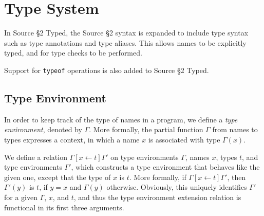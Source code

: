 \newcommand{\Rule}[2]{\genfrac{}{}{0.7pt}{}{{\setlength{\fboxrule}{0pt}\setlength{\fboxsep}{3mm}\fbox{$#1$}}}{{\setlength{\fboxrule}{0pt}\setlength{\fboxsep}{3mm}\fbox{$#2$}}}}

\newcommand{\TruE}{\textbf{\texttt{true}}}
\newcommand{\FalsE}{\textbf{\texttt{false}}}
\newcommand{\AndOp}{\texttt{\&\&}}
\newcommand{\OrOp}{\texttt{||}}
\newcommand{\ThenOp}{\texttt{?}}
\newcommand{\ElseOp}{\texttt{:}}
\newcommand{\Rc}{\texttt{\}}}
\newcommand{\Lc}{\texttt{\{}}
\newcommand{\Rp}{\texttt{)}}
\newcommand{\Lp}{\texttt{(}}
\newcommand{\Fun}{\textbf{\texttt{function}}}
\newcommand{\Let}{\textbf{\texttt{let}}}
\newcommand{\Return}{\textbf{\texttt{return}}}
\newcommand{\Const}{\textbf{\texttt{const}}}
\newcommand{\If}{\textbf{\texttt{if}}}
\newcommand{\Else}{\textbf{\texttt{else}}}
\newcommand{\Bool}{\texttt{boolean}}
\newcommand{\Number}{\texttt{number}}
\newcommand{\String}{\texttt{string}}
\newcommand{\Undefined}{\texttt{undefined}}
\newcommand{\Null}{\texttt{null}}
\newcommand{\Any}{\texttt{any}}
\newcommand{\Void}{\texttt{void}}
\newcommand{\Pred}{\textit{Pred}}
\newcommand{\type}{\textit{type}}
\newcommand{\polytype}{\textit{polytype}}
\newcommand{\predtype}{\textit{predtype}}
\newcommand{\ExtractPos}{\ensuremath{\textit{Extract}^+}}
\newcommand{\ExtractNeg}{\ensuremath{\textit{Extract}^-}}

\newtheorem{definition}{Definition}[section]

\section{Type System}  

In Source \S 2 Typed, the Source \S 2 syntax is expanded to include type syntax such as type annotations and type aliases.
This allows names to be explicitly typed, and for type checks to be performed.

Support for \texttt{typeof} operations is also added to Source \S 2 Typed.

\subsection{Type Environment}

In order to keep track of the type of names in a program, we define a
\emph{type environment}, denoted by $\Gamma$. More
formally,
the partial function $\Gamma$ from names to types expresses a 
context, in which a name $x$ is associated with type $\Gamma(x)$. 

We define a relation $\Gamma[x \leftarrow t]\Gamma'$ on type environments 
$\Gamma$, names $x$, types $t$, and type environments $\Gamma'$,
which constructs a type environment that behaves like the 
given one, except that the type of $x$ is $t$. More formally, 
if $\Gamma[x \leftarrow t]\Gamma'$, then $\Gamma'(y)$ is $t$, 
if $y=x$ and $\Gamma(y)$ 
otherwise. Obviously, this uniquely identifies $\Gamma'$ for
a given $\Gamma$, $x$, and $t$, and thus the type environment extension
relation is functional in its first three arguments.

